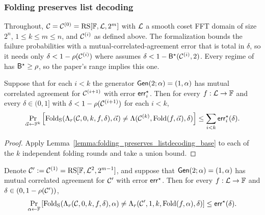 \subsubsection{Folding preserves list decoding}

Throughout, $\mathcal{C} = \mathcal{C}^{(0)} = \mathrm{RS}[\mathbb{F}, \mathcal{L}, 2^m]$ with $\mathcal{L}$ a smooth
coset FFT domain of size $2^n$, $1 \le k \leq m\le n$, and $\mathcal{C}^{(i)}$ as defined above.
The formalization bounds the failure probabilities with a mutual-correlated-agreement error that is
total in $\delta$, so it needs only $\delta<1-\rho(\mathcal{C}^{(i)})$ where \cite{ACFY24} assumes
$\delta<1-{\mathsf{B}}^\star(\mathcal{C}^{(i)},2)$. Every regime of \cite{ACFY24} has
${\mathsf{B}}^\star\ge\rho$, so the paper's range implies this one.

\begin{theorem}\label{thm:folding_preserves_listdecoding}
\leanok
{}
    Suppose that for each $i<k$ the generator $\mathsf{Gen}(2; \alpha) = (1, \alpha)$ has mutual correlated
    agreement for $\mathcal{C}^{(i+1)}$ with error $\mathsf{err}^\star_i$. Then for every $f : \mathcal{L} \to
    \mathbb{F}$ and every $\delta \in (0,1]$ with $\delta<1-\rho(\mathcal{C}^{(i+1)})$ for each $i<k$,
    \[
    \Pr_{\vec\alpha \leftarrow \mathbb{F}^k} \left[
    \mathrm{Fold_S}(\Lambda_{r}(\mathcal{C}, 0, k, f, \delta), \vec\alpha)
    \neq \Lambda(\mathcal{C}^{(k)}, \mathrm{Fold}(f, \vec\alpha), \delta)
    \right] \le \sum_{i<k}\mathsf{err}^\star_i(\delta).
    \]
\end{theorem}
\begin{proof}
\leanok
Apply Lemma~\ref{lemma:folding_preserves_listdecoding_base} to each of the $k$ independent
folding rounds and take a union bound.
\end{proof}

\begin{lemma}\label{lemma:folding_preserves_listdecoding_base}
\leanok
{}
    Denote $\mathcal{C}' := \mathcal{C}^{(1)} = \mathrm{RS}[\mathbb{F}, \mathcal{L}^{2}, 2^{m - 1}]$, and suppose that
    $\mathsf{Gen}(2;\alpha)=(1,\alpha)$ has mutual correlated agreement for $\mathcal{C}'$ with error
    $\mathsf{err}^\star$. Then for every $f : \mathcal{L} \to \mathbb{F}$ and $\delta \in (0, 1 -
    \rho(\mathcal{C}'))$,
    \[
    \Pr_{\alpha \leftarrow \mathbb{F}} \left[
    \mathrm{Fold_S}(\Lambda_{r}(\mathcal{C}, 0, k, f, \delta), \alpha)
    \neq \Lambda_{r}(\mathcal{C}', 1, k, \mathrm{Fold}(f, \alpha), \delta)
    \right] \le \mathsf{err}^\star(\delta).
    \]
\end{lemma}

